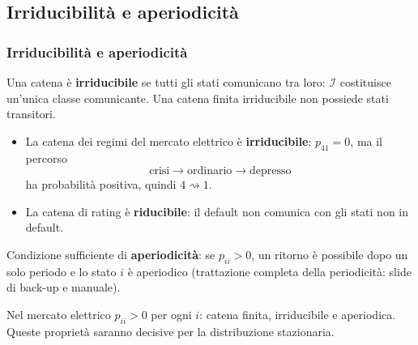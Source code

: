 \documentclass[handout]{beamer}%
\newenvironment{stepitemize}{\begin{itemize}[<+->]}{\end{itemize} }
\providecommand{\QTR}[2]{\csname #1\endcsname{#2}}
\begin{document}


\subsection{Irriducibilit\`{a} e aperiodicit\`{a}}%

\begin{frame}%
%

\frametitle{Irriducibilit\`{a} e aperiodicit\`{a}}%
%

%


Una catena \`{e} \textbf{irriducibile} se tutti gli stati comunicano tra loro:
$\mathcal{I}$ costituisce un'unica classe comunicante. Una catena finita
irriducibile non possiede stati transitori.

\medskip

\begin{stepitemize}
\item La catena dei regimi del mercato elettrico \`{e} \textbf{irriducibile}:
$p_{41}=0$, ma il percorso
\[
\text{crisi} \longrightarrow\text{ordinario} \longrightarrow\text{depresso}
\]
ha probabilit\`{a} positiva, quindi $4\rightsquigarrow1$.

\item La catena di rating \`{e} \textbf{riducibile}: il default non comunica
con gli stati non in default.
\end{stepitemize}

\medskip

Condizione sufficiente di \textbf{aperiodicit\`{a}}: se $p_{ii}>0$, un ritorno
\`{e} possibile dopo un solo periodo e lo stato $i$ \`{e} aperiodico
(trattazione completa della periodicit\`{a}: slide di back-up e manuale).

\medskip

\begin{center}
{\small Nel mercato elettrico $p_{ii}>0$ per ogni $i$: catena finita,
irriducibile e aperiodica. Queste propriet\`{a} saranno decisive per la
distribuzione stazionaria.}
\end{center}%

\transboxout
\end{frame}%
\end{document}
